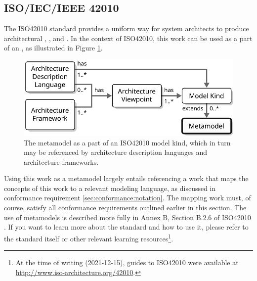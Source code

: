 \newpage

\subsection{ISO/IEC/IEEE 42010}
\label{sec:conformance:iso42010}

The ISO42010 \cite{iso42010} standard provides a uniform way for system architects to produce architectural , ,  and .
In the context of ISO42010, this work can be used as a  part of an , as illustrated in Figure \ref{fig:iso42010}.

\begin{figure}[ht!]
  \centering
  \includegraphics[scale=0.9]{figures/iso42010}
  \caption{
    The metamodel as a part of an ISO42010 model kind, which in turn may be referenced by architecture description languages and architecture frameworks.
  }
  \label{fig:iso42010}
\end{figure}

Using this work as a metamodel largely entails referencing a work that maps the concepts of this work to a relevant modeling language, as discussed in conformance requirement \ref{sec:conformance:notation}.
The mapping work must, of course, satisfy all conformance requirements outlined earlier in this section.
The use of metamodels is described more fully in Annex B, Section B.2.6 of ISO42010 \cite{iso42010}.
If you want to learn more about the standard and how to use it, please refer to the standard itself or other relevant learning resources\footnote{At the time of writing (2021-12-15), guides to ISO42010 were available at \url{http://www.iso-architecture.org/42010}.}.